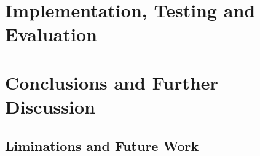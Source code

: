 \documentclass[12pt]{report}
\theoremstyle{plain}
\theoremstyle{definition}
\begin{document}

\newpage
\chapter{Implementation, Testing and Evaluation}




\newpage
\chapter{Conclusions and Further Discussion}

\section{Liminations and Future Work}


\printbibliography
\end{document}
